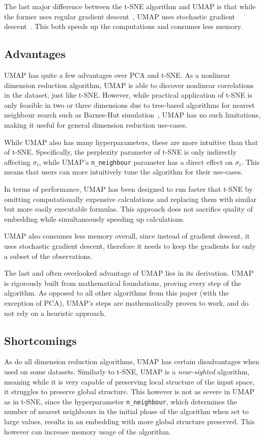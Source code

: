 The last major difference between the t-SNE algorithm and UMAP is that while the former uses regular gradient descent~\cite{bib:gd}, UMAP uses stochastic gradient descent~\cite{bib:sgd}. This both speeds up the computations and consumes less memory.

\subsection{Advantages}

UMAP has quite a few advantages over PCA and t-SNE. As a nonlinear dimension reduction algorithm, UMAP is able to discover nonlinear correlations in the dataset, just like t-SNE. However, while practical application of t-SNE is only feasible in two or three dimensions due to tree-based algorithms for nearest neighbour search such as Barnes-Hut simulation~\cite{bib:barnes-hut}, UMAP has no such limitations, making it useful for general dimension reduction use-cases.

While UMAP also has many hyperparameters, these are more intuitive than that of t-SNE. Specifically, the perplexity parameter of t-SNE is only indirectly affecting $\sigma_i$, while UMAP's \texttt{n\_neighbour} parameter has a direct effect on $\sigma_i$. This means that users can more intuitively tune the algorithm for their use-cases.

In terms of performance, UMAP has been designed to run faster that t-SNE by omitting computationally expensive calculations and replacing them with similar but more easily executable formulas. This approach does not sacrifice quality of embedding while simultaneously speeding up calculations.

UMAP also consumes less memory overall, since instead of gradient descent, it uses stochastic gradient descent, therefore it needs to keep the gradients for only a subset of the observations.

The last and often overlooked advantage of UMAP lies in its derivation. UMAP is rigorously built from mathematical foundations, proving every step of the algorithm. As opposed to all other algorithms from this paper (with the exception of PCA), UMAP's steps are mathematically proven to work, and do not rely on a heuristic approach.

\subsection{Shortcomings}

As do all dimension reduction algorithms, UMAP has certain disadvantages when used on some datasets. Similarly to t-SNE, UMAP is a \textit{near-sighted} algorithm, meaning while it is very capable of preserving local structure of the input space, it struggles to preserve global structure. This however is not as severe in  UMAP as in t-SNE, since the hyperparameter \texttt{n\_neighbour}, which determines the number of nearest neighbours in the initial phase of the algorithm when set to large values, results in an embedding with more global structure preserved. This however can increase memory usage of the algorithm.

